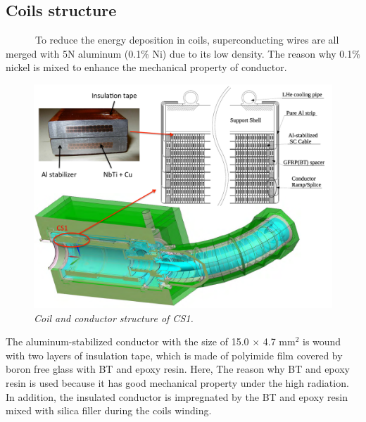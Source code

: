\subsection{Coils structure}
~~~~~~To reduce the energy deposition in coils, superconducting wires are all merged with 5N aluminum (0.1\% Ni) due to its low density.
The reason why 
0.1\% nickel is mixed to enhance the mechanical property of conductor.
\begin{figure}[H]
 \centering
 \includegraphics[scale=0.45]{chapter2/fig/coil.pdf}
 \caption{\it Coil and conductor structure of CS1.}
 \label{cssrtu}
\end{figure}

The aluminum-stabilized conductor with the size of 15.0 $\times$ 4.7 mm$^2$ is wound with two layers of insulation tape, which is made of polyimide film covered by boron free glass with BT and epoxy resin.
Here, The reason why BT and epoxy resin is used because it has good mechanical property under the high radiation.
In addition, the insulated conductor is impregnated by the BT and epoxy resin mixed with silica filler during the coils winding.


